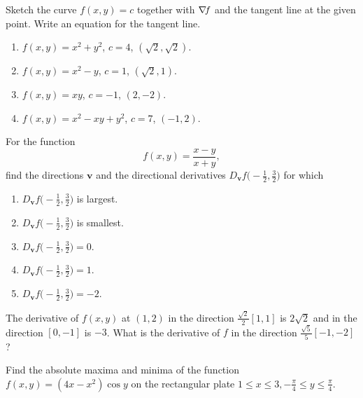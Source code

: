 \begin{problem}[Basic]
Sketch the curve $f(x,y)=c$ together with $\mathop{\nabla\! {f}}$ and the tangent line at the given point.  Write an equation for the tangent line.
\begin{enumerate}
	\item $f(x,y)=x^2+y^2$, $c=4$, $(\sqrt{2}, \sqrt{2})$.
	\item $f(x,y)=x^2-y$, $c=1$, $(\sqrt{2}, 1)$.
	\item $f(x,y)=xy$, $c=-1$, $(2, -2)$.
	\item $f(x,y)=x^2-xy+y^2$, $c=7$, $(-1,2)$.
\end{enumerate}
\end{problem}

\begin{problem}[Basic]
For the function
\begin{equation*}
f(x,y) = \frac{x-y}{x+y},
\end{equation*}
find the directions $\boldsymbol{v}$ and the directional derivatives $D_{\boldsymbol{v}}f\big( -\tfrac{1}{2}, \tfrac{3}{2}\big)$ for which
\begin{enumerate}
	\item $D_{\boldsymbol{v}}f\big( -\tfrac{1}{2}, \tfrac{3}{2}\big)$ is largest.
	\item $D_{\boldsymbol{v}}f\big( -\tfrac{1}{2}, \tfrac{3}{2}\big)$ is smallest.
	\item $D_{\boldsymbol{v}}f\big( -\tfrac{1}{2}, \tfrac{3}{2}\big) = 0$.
	\item $D_{\boldsymbol{v}}f\big( -\tfrac{1}{2}, \tfrac{3}{2}\big) = 1$.
	\item $D_{\boldsymbol{v}}f\big( -\tfrac{1}{2}, \tfrac{3}{2}\big) = -2$.
\end{enumerate}
\end{problem}

\begin{problem}[Intermediate]
The derivative of $f(x,y)$ at $(1,2)$ in the direction $\frac{\sqrt{2}}{2}[1,1]$ is $2\sqrt{2}$ and in the direction $[0,-1]$ is $-3$.  What is the derivative of $f$ in the direction $\frac{\sqrt{5}}{5}[-1,-2]$?
\end{problem}

\begin{problem}[Basic]
Find the absolute maxima and minima of the function $f(x,y) = (4x-x^2)\cos y$ on the rectangular plate $1\leq x \leq 3, -\frac{\pi}{4} \leq y \leq \frac{\pi}{4}$.
\end{problem}

